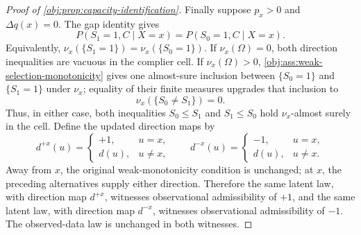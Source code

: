 \begin{proof}[Proof of \cref{obj:prop:capacity-identification}]
Finally suppose \(p_x>0\) and \(\Delta q(x)=0\).  The gap identity gives
\[
P(S_1=1,C\mid X=x)=P(S_0=1,C\mid X=x).
\]
Equivalently, \(\nu_x(\{S_1=1\})=\nu_x(\{S_0=1\})\).  If \(\nu_x(\Omega)=0\), both direction inequalities are vacuous in the complier cell.  If \(\nu_x(\Omega)>0\), \cref{obj:ass:weak-selection-monotonicity} gives one almost-sure inclusion between \(\{S_0=1\}\) and \(\{S_1=1\}\) under \(\nu_x\); equality of their finite measures upgrades that inclusion to
\[
\nu_x(\{S_0\ne S_1\})=0.
\]
Thus, in either case, both inequalities \(S_0\le S_1\) and \(S_1\le S_0\) hold \(\nu_x\)-almost surely in the cell.  Define the updated direction maps by
\[
d^{+x}(u)=
\begin{cases}
+1,&u=x,\\
d(u),&u\ne x,
\end{cases}
\qquad
 d^{-x}(u)=
\begin{cases}
-1,&u=x,\\
d(u),&u\ne x.
\end{cases}
\]
Away from \(x\), the original weak-monotonicity condition is unchanged; at \(x\), the preceding alternatives supply either direction.  Therefore the same latent law, with direction map \(d^{+x}\), witnesses observational admissibility of \(+1\), and the same latent law, with direction map \(d^{-x}\), witnesses observational admissibility of \(-1\).  The observed-data law is unchanged in both witnesses.
\end{proof}

